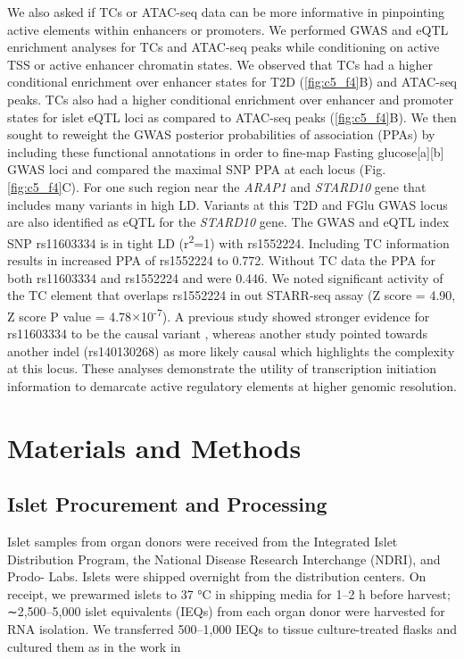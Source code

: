 We also asked if TCs or ATAC-seq data can be more informative in pinpointing active elements within enhancers or promoters. We performed GWAS and eQTL enrichment analyses for TCs and ATAC-seq peaks while conditioning on active TSS or active enhancer chromatin states. We observed that TCs had a higher conditional enrichment over enhancer states for T2D (\ref{fig:c5_f4}B) and ATAC-seq peaks. TCs also had a higher conditional enrichment over enhancer and promoter states for islet eQTL loci as compared to ATAC-seq peaks  (\ref{fig:c5_f4}B). We then sought to reweight the GWAS posterior probabilities of association (PPAs) by including these functional annotations in order to fine-map Fasting glucose[a][b] GWAS loci and compared the maximal SNP PPA at each locus (Fig. \ref{fig:c5_f4}C). For one such region near the \textit{ARAP1} and \textit{STARD10} gene that includes many variants in high LD. Variants at this T2D and FGlu GWAS locus are also identified as eQTL for the \textit{STARD10} gene. The GWAS and eQTL index SNP rs11603334 is in tight LD (r\textsuperscript{2}=1) with rs1552224. Including TC information results in increased PPA of rs1552224 to 0.772. Without TC data the PPA for both rs11603334 and rs1552224 and were 0.446. We noted significant activity of the TC element that overlaps rs1552224 in out STARR-seq assay (Z score = 4.90, Z score P value = 4.78$\times$10\textsuperscript{-7}). A previous study showed stronger evidence for rs11603334 to be the causal variant \cite{kulzerCommonFunctionalRegulatory2014}, whereas another study pointed towards another indel (rs140130268) as more likely causal \cite{carratDecreasedSTARD10Expression2017} which highlights the complexity at this locus. These analyses demonstrate the utility of transcription initiation information to demarcate active regulatory elements at higher genomic resolution.  

\section{Materials and Methods}


\subsection{Islet Procurement and Processing}
Islet samples from organ donors were received from the Integrated Islet Distribution Program, the National Disease Research Interchange (NDRI), and Prodo- Labs. Islets were shipped overnight from the distribution centers. On receipt, we prewarmed islets to 37 °C in shipping media for 1–2 h before harvest; ∼2,500–5,000 islet equivalents (IEQs) from each organ donor were harvested for RNA isolation. We transferred 500–1,000 IEQs to tissue culture-treated flasks and cultured them as in the work in \cite{gershengornEpithelialtoMesenchymalTransitionGenerates2004} 
